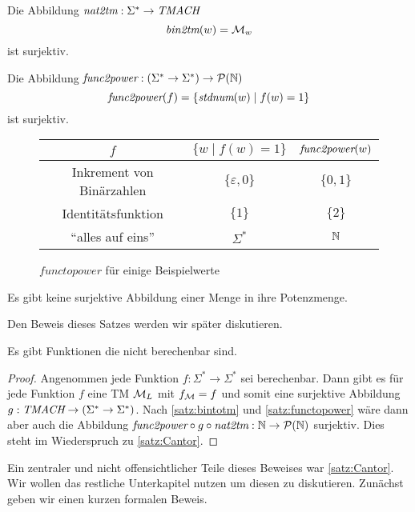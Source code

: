 \begin{lemma}\label{satz:bintotm}
 Die Abbildung $\textit{nat2tm}: \Sigma^*\rightarrow \textit{TMACH}$ 
 $$ \textit{bin2tm}(w)=\mathcal{M}_w$$
ist surjektiv.
\end{lemma}

\begin{lemma}\label{satz:functopower}
Die Abbildung $\textit{func2power}:(\Sigma^*\rightarrow\Sigma^*)\rightarrow \mathcal{P}(\mathbb{N})$
$$\textit{func2power}(f)=\{\textit{stdnum}(w)\mid f(w)=1\}$$
ist surjektiv.
\end{lemma}

 \begin{figure}[H]\centering
    \begin{tabular}{ccc}
    $f$ & $\{w\mid f(w)=1\}$ & $\textit{func2power}(w)$\\ \hline
    Inkrement von Binärzahlen & $\{\varepsilon, 0\}$ & $\{0,1\}$\\
    Identitätsfunktion & $\{1\}$ & $\{2\}$\\
    "`alles auf eins"' & $\Sigma^*$ & $\mathbb{N}$
    \end{tabular}

	\caption{$functopower$ für einige Beispielwerte}
\end{figure}


\begin{Satz}[Cantor]\label{satz:Cantor}
Es gibt keine surjektive Abbildung einer Menge in ihre Potenzmenge.
\end{Satz}
Den Beweis dieses Satzes werden wir später diskutieren.

\begin{Satz}
 Es gibt Funktionen die nicht berechenbar sind.
\end{Satz}
\begin{proof}
 Angenommen jede Funktion $f:\Sigma^*\rightarrow\Sigma^*$ sei berechenbar.
 Dann gibt es für jede Funktion $f$ eine \ac{TM} $\mathcal{M}_L$ mit $f_{\mathcal{M}}=f$ und somit eine surjektive Abbildung $g:\textit{TMACH}\rightarrow(\Sigma^*\rightarrow\Sigma^*)$.
 Nach \autoref{satz:bintotm} und \autoref{satz:functopower} wäre dann aber auch die Abbildung $\textit{func2power}\circ g \circ\textit{nat2tm}:\mathbb{N}\rightarrow\mathcal{P}(\mathbb{N})$ surjektiv.
 Dies steht im Wiederspruch zu \autoref{satz:Cantor}.
\end{proof}

Ein zentraler und nicht offensichtlicher Teile dieses Beweises war \autoref{satz:Cantor}.
Wir wollen das restliche Unterkapitel nutzen um diesen zu diskutieren.
Zunächst geben wir einen kurzen formalen Beweis.

